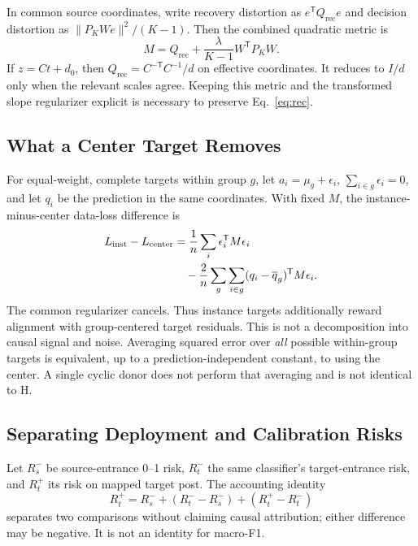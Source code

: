 In common source coordinates, write recovery distortion as $e^{\mathsf T}Q_{\mathrm{rec}}e$ and decision distortion as $\|P_KWe\|^2/(K-1)$. Then the combined quadratic metric is
\begin{equation}
 M=Q_{\mathrm{rec}}+\frac{\lambda}{K-1}W^{\mathsf T}P_KW.
\end{equation}
If $z=Ct+d_0$, then $Q_{\mathrm{rec}}=C^{-\mathsf T}C^{-1}/d$ on effective coordinates. It reduces to $I/d$ only when the relevant scales agree. Keeping this metric and the transformed slope regularizer explicit is necessary to preserve Eq.~\eqref{eq:rec}.

\subsection{What a Center Target Removes}
For equal-weight, complete targets within group $g$, let $a_i=\mu_g+\epsilon_i$, $\sum_{i\in g}\epsilon_i=0$, and let $q_i$ be the prediction in the same coordinates. With fixed $M$, the instance-minus-center data-loss difference is
\begin{align}
 L_{\rm inst}-L_{\rm center}
 &=\frac1n\sum_i\epsilon_i^{\mathsf T}M\epsilon_i\nonumber\\
 &\quad-\frac2n\sum_g\sum_{i\in g}(q_i-\overline q_g)^{\mathsf T}M\epsilon_i.\label{eq:center}
\end{align}
The common regularizer cancels. Thus instance targets additionally reward alignment with group-centered target residuals. This is not a decomposition into causal signal and noise. Averaging squared error over \emph{all} possible within-group targets is equivalent, up to a prediction-independent constant, to using the center. A single cyclic donor does not perform that averaging and is not identical to H.

\subsection{Separating Deployment and Calibration Risks}
Let $R_s^-$ be source-entrance 0--1 risk, $R_t^-$ the same classifier's target-entrance risk, and $R_t^+$ its risk on mapped target post. The accounting identity
\begin{equation}
 R_t^+=R_s^-+(R_t^--R_s^-)+(R_t^+-R_t^-)
\end{equation}
separates two comparisons without claiming causal attribution; either difference may be negative. It is not an identity for macro-F1.

